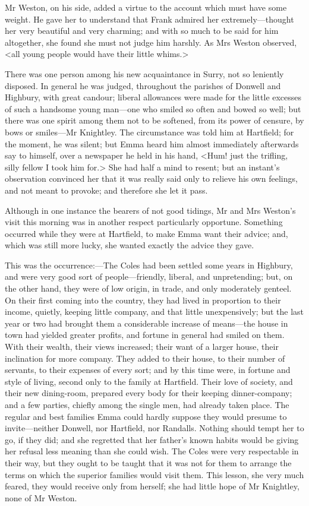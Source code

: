 Mr Weston, on his side, added a virtue to the account which must have some weight. He gave her to understand that Frank admired her extremely—thought her very beautiful and very charming; and with so much to be said for him altogether, she found she must not judge him harshly. As Mrs Weston observed, <all young people would have their little whims.>

There was one person among his new acquaintance in Surry, not so leniently disposed. In general he was judged, throughout the parishes of Donwell and Highbury, with great candour; liberal allowances were made for the little excesses of such a handsome young man—one who smiled so often and bowed so well; but there was one spirit among them not to be softened, from its power of censure, by bows or smiles—Mr Knightley. The circumstance was told him at Hartfield; for the moment, he was silent; but Emma heard him almost immediately afterwards say to himself, over a newspaper he held in his hand, <Hum! just the trifling, silly fellow I took him for.> She had half a mind to resent; but an instant's observation convinced her that it was really said only to relieve his own feelings, and not meant to provoke; and therefore she let it pass.

Although in one instance the bearers of not good tidings, Mr and Mrs Weston's visit this morning was in another respect particularly opportune. Something occurred while they were at Hartfield, to make Emma want their advice; and, which was still more lucky, she wanted exactly the advice they gave.

This was the occurrence:—The Coles had been settled some years in Highbury, and were very good sort of people—friendly, liberal, and unpretending; but, on the other hand, they were of low origin, in trade, and only moderately genteel. On their first coming into the country, they had lived in proportion to their income, quietly, keeping little company, and that little unexpensively; but the last year or two had brought them a considerable increase of means—the house in town had yielded greater profits, and fortune in general had smiled on them. With their wealth, their views increased; their want of a larger house, their inclination for more company. They added to their house, to their number of servants, to their expenses of every sort; and by this time were, in fortune and style of living, second only to the family at Hartfield. Their love of society, and their new dining-room, prepared every body for their keeping dinner-company; and a few parties, chiefly among the single men, had already taken place. The regular and best families Emma could hardly suppose they would presume to invite—neither Donwell, nor Hartfield, nor Randalls. Nothing should tempt her to go, if they did; and she regretted that her father's known habits would be giving her refusal less meaning than she could wish. The Coles were very respectable in their way, but they ought to be taught that it was not for them to arrange the terms on which the superior families would visit them. This lesson, she very much feared, they would receive only from herself; she had little hope of Mr Knightley, none of Mr Weston.

